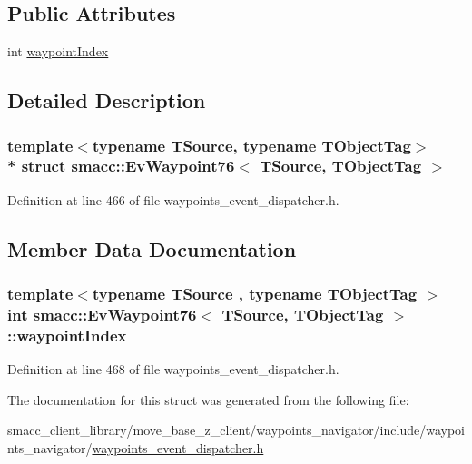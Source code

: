 \subsection*{Public Attributes}
\begin{DoxyCompactItemize}
\item 
int \hyperlink{structsmacc_1_1EvWaypoint76_a874e6992b68443f8870051e9ff687ba2}{waypoint\+Index}
\end{DoxyCompactItemize}


\subsection{Detailed Description}
\subsubsection*{template$<$typename T\+Source, typename T\+Object\+Tag$>$\\*
struct smacc\+::\+Ev\+Waypoint76$<$ T\+Source, T\+Object\+Tag $>$}



Definition at line 466 of file waypoints\+\_\+event\+\_\+dispatcher.\+h.



\subsection{Member Data Documentation}
\subsubsection[{\texorpdfstring{waypoint\+Index}{waypointIndex}}]{\setlength{\rightskip}{0pt plus 5cm}template$<$typename T\+Source , typename T\+Object\+Tag $>$ int {\bf smacc\+::\+Ev\+Waypoint76}$<$ T\+Source, T\+Object\+Tag $>$\+::waypoint\+Index}\hypertarget{structsmacc_1_1EvWaypoint76_a874e6992b68443f8870051e9ff687ba2}{}\label{structsmacc_1_1EvWaypoint76_a874e6992b68443f8870051e9ff687ba2}


Definition at line 468 of file waypoints\+\_\+event\+\_\+dispatcher.\+h.



The documentation for this struct was generated from the following file\+:\begin{DoxyCompactItemize}
\item 
smacc\+\_\+client\+\_\+library/move\+\_\+base\+\_\+z\+\_\+client/waypoints\+\_\+navigator/include/waypoints\+\_\+navigator/\hyperlink{waypoints__event__dispatcher_8h}{waypoints\+\_\+event\+\_\+dispatcher.\+h}\end{DoxyCompactItemize}

